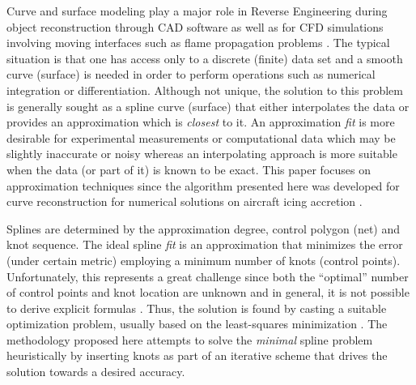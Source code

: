 
 Curve and surface modeling play a major role in Reverse Engineering during object reconstruction
  through CAD software \cite{Ma1998, sarkar1991} as well as for CFD simulations involving moving
  interfaces such as flame propagation problems \cite{malladi1995}. 
  The typical situation is that one has access only to a discrete (finite) data set 
  and a smooth curve (surface) is needed in order to perform operations such as numerical integration or differentiation. 
  Although not unique, the solution to this problem is generally sought as a spline curve (surface)  
  that either interpolates the data or provides an approximation which is \emph{closest} to it.
   An approximation \emph{fit} is more desirable for experimental measurements or computational data 
   which may be slightly inaccurate or noisy whereas an interpolating approach \cite{piegl1999,ma1995} 
   is more suitable when
   the data (or part of it) is known to be exact. This paper focuses on 
   approximation techniques since the algorithm presented here was developed for 
    curve reconstruction for numerical solutions on aircraft icing accretion \cite{}. 
    
    Splines are determined by the approximation degree, 
    control polygon (net) and knot sequence. The ideal spline \emph{fit} is an approximation
     that minimizes the error (under certain metric) employing a minimum number 
     of knots (control points).  Unfortunately, this represents a great challenge since both the ``optimal'' number of control points 
  and knot location are unknown and in general, it is not possible to derive explicit formulas \cite{jupp1978}.  
  Thus, the solution is found by casting a suitable optimization problem, 
  usually based on the least-squares minimization \cite{nurbs_book, deboor2001practical, schumaker2015spline}. 
   The methodology proposed here attempts to solve the \emph{minimal} spline problem 
    heuristically by inserting knots 
   as part of an iterative scheme that drives the solution towards a desired accuracy. 
      
